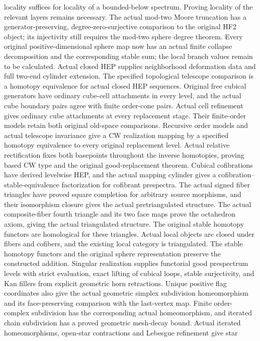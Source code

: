 locality suffices for locality of a bounded-below spectrum. Proving locality
of the relevant layers remains necessary. The actual mod-two Moore truncation
has a generator-preserving, degree-zero-surjective comparison to the original
HF2 object; its injectivity still requires the mod-two sphere degree theorem.
Every original positive-dimensional sphere map now has an actual finite
collapse decomposition and the corresponding stable sum; the local branch
values remain to be calculated.
Actual closed HEP supplies neighborhood deformation data and full two-end
cylinder extension. The specified topological telescope comparison is a
homotopy equivalence for actual closed HEP sequences. Original free cubical
generators have ordinary cube-cell attachments in every level, and the actual
cube boundary pairs agree with finite order-cone pairs. Actual cell refinement
gives ordinary cube attachments at every replacement stage. Their finite-order
models retain both original old-space comparisons. Recursive order models and
actual telescope invariance give a CW realization mapping by a specified
homotopy equivalence to every original replacement level. Actual relative
rectification fixes both basepoints throughout the inverse homotopies, proving
based CW type and the original good-replacement theorem. Cubical
cofibrations have derived levelwise HEP, and the actual mapping cylinder gives
a cofibration--stable-equivalence factorization for cofibrant prespectra.
The actual signed fiber triangles
have proved square completion for arbitrary source morphisms, and their
isomorphism closure gives the actual pretriangulated structure. The actual
composite-fiber fourth triangle and its two face maps prove the octahedron
axiom, giving the actual triangulated structure. The original stable homotopy
functors are homological for these triangles. Actual local objects are closed
under fibers and cofibers, and the existing local category is triangulated.
The stable homotopy functors and the original sphere representation preserve
the constructed addition. Singular
realization supplies functorial good prespectrum levels with strict evaluation,
exact lifting of cubical loops, stable surjectivity, and Kan fillers from
explicit geometric horn retractions. Unique positive flag coordinates also
give the actual geometric simplex subdivision homeomorphism and its
face-preserving comparison with the last-vertex map. Finite order-complex
subdivision has the corresponding actual homeomorphism, and iterated chain
subdivision has a proved geometric mesh-decay bound. Actual iterated
homeomorphisms, open-star contractions and Lebesgue refinement give star
